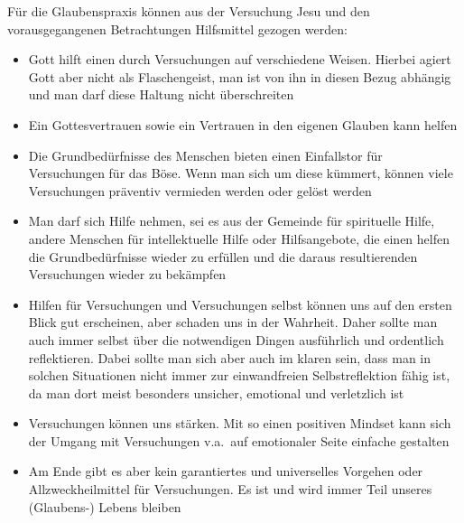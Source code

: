 Für die Glaubenspraxis können aus der Versuchung Jesu und den vorausgegangenen Betrachtungen Hilfsmittel gezogen
werden:
\begin{itemize}
    \item Gott hilft einen durch Versuchungen auf verschiedene Weisen. Hierbei agiert Gott aber nicht als Flaschengeist, man ist
          von ihn in diesen Bezug abhängig und man darf diese Haltung nicht überschreiten
    \item Ein Gottesvertrauen sowie ein Vertrauen in den eigenen Glauben kann helfen
    \item Die Grundbedürfnisse des Menschen bieten einen Einfallstor für Versuchungen für das Böse. Wenn man sich um diese
          kümmert, können viele Versuchungen präventiv vermieden werden oder gelöst werden
    \item Man darf sich Hilfe nehmen, sei es aus der Gemeinde für spirituelle Hilfe, andere Menschen für intellektuelle Hilfe
          oder Hilfsangebote, die einen helfen die Grundbedürfnisse wieder zu erfüllen und die daraus resultierenden Versuchungen
          wieder zu bekämpfen
    \item Hilfen für Versuchungen und Versuchungen selbst können uns auf den ersten Blick gut erscheinen, aber schaden uns in der
          Wahrheit. Daher sollte man auch immer selbst über die notwendigen Dingen ausführlich und ordentlich reflektieren. Dabei
          sollte man sich aber auch im klaren sein, dass man in solchen Situationen nicht immer zur einwandfreien
          Selbstreflektion fähig ist, da man dort meist besonders unsicher, emotional und verletzlich ist
    \item Versuchungen können uns stärken. Mit so einen positiven Mindset kann sich der Umgang mit Versuchungen v.a.\ auf
          emotionaler Seite einfache gestalten
    \item Am Ende gibt es aber kein garantiertes und universelles Vorgehen oder Allzweckheilmittel für Versuchungen. Es ist und
          wird immer Teil unseres (Glaubens-) Lebens bleiben
\end{itemize}